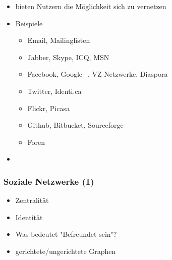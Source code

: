 \documentclass{beamer}
\begin{document}
\begin{frame}
  \begin{itemize}
    \item bieten Nutzern die Möglichkeit sich zu vernetzen
    \item Beispiele
      \begin{itemize}
        \item Email, Mailinglisten
        \item Jabber, Skype, ICQ, MSN
        \item Facebook, Google+, VZ-Netzwerke, Diaspora
        \item Twitter, Identi.ca
        \item Flickr, Picasa
        \item Github, Bitbucket, Sourceforge
        \item Foren
      \end{itemize}
    \item 
  \end{itemize}
\end{frame}

\begin{frame}
  \frametitle{Soziale Netzwerke (1)}
  \begin{itemize}
    \item<2-> Zentralität
    \item<3-> Identität
    \item<4-> Was bedeutet "Befreundet sein"?
    \item<5-> gerichtete/ungerichtete Graphen
  \end{itemize}
\end{frame}
\end{document}
